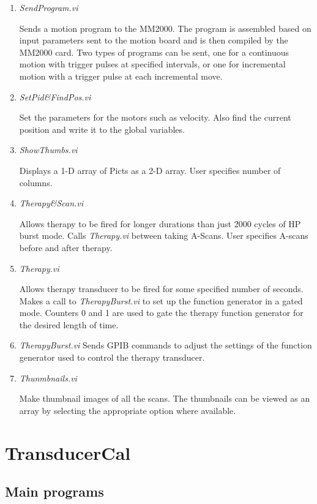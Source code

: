 \documentclass[10pt]{article}
\begin{document}
\begin{enumerate}
\item {\it SendProgram.vi}

Sends a motion program to the MM2000. The program is assembled
based on input parameters sent to the motion board and is then
compiled by the MM2000 card. Two types of programs can be sent,
one for a continuous motion with trigger pulses at specified
intervals, or one for incremental motion with a trigger pulse at
each incremental move.

\item {\it SetPid\&FindPos.vi}

Set the parameters for the motors such as velocity. Also find the
current position and write it to the global variables.

\item {\it ShowThumbs.vi}

Displays a 1-D array of Picts as a 2-D array. User specifies
number of columns.

\item {\it Therapy\&Scan.vi}

Allows therapy to be fired for longer durations than just 2000
cycles of HP burst mode. Calls {\it Therapy.vi} between taking
A-Scans. User specifies A-scans before and after therapy.

\item {\it Therapy.vi}

Allows therapy transducer to be fired for some specified number of
seconds. Makes a call to {\it TherapyBurst.vi} to set up the
function generator in a gated mode. Counters 0 and 1 are used to
gate the therapy function generator for the desired length of
time.


\item {\it TherapyBurst.vi}
Sends GPIB commands to adjust the settings of the function
generator used to control the therapy transducer.

\item {\it Thunmbnails.vi}

Make thumbnail images of all the scans. The thumbnails can be
viewed as an array by selecting the appropriate option where
available.

\end{enumerate}


\section{TransducerCal}


\subsection{Main programs}
\end{document}
